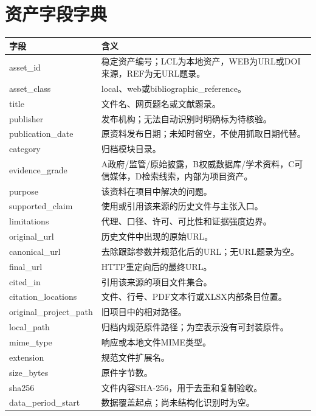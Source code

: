 \documentclass[UTF8,openany,oneside,11pt]{ctexbook}
\begin{document}
\chapter{资产字段字典}
\begin{longtable}{L{4cm}L{11.6cm}}\toprule
字段 & 含义\\\midrule\endhead
asset\_\allowbreak{}id & 稳定资产编号；LCL为本地资产，WEB为URL或DOI来源，REF为无URL题录。 \\
asset\_\allowbreak{}class & local、web或bibliographic\_reference。 \\
title & 文件名、网页题名或文献题录。 \\
publisher & 发布机构；无法自动识别时明确标为待核验。 \\
publication\_\allowbreak{}date & 原资料发布日期；未知时留空，不使用抓取日期代替。 \\
category & 归档模块目录。 \\
evidence\_\allowbreak{}grade & A政府/监管/原始披露，B权威数据库/学术资料，C可信媒体，D检索线索，内部为项目资产。 \\
purpose & 该资料在项目中解决的问题。 \\
supported\_\allowbreak{}claim & 使用或引用该来源的历史文件与主张入口。 \\
limitations & 代理、口径、许可、可比性和证据强度边界。 \\
original\_\allowbreak{}url & 历史文件中出现的原始URL。 \\
canonical\_\allowbreak{}url & 去除跟踪参数并规范化后的URL；无URL题录为空。 \\
final\_\allowbreak{}url & HTTP重定向后的最终URL。 \\
cited\_\allowbreak{}in & 引用该来源的项目文件集合。 \\
citation\_\allowbreak{}locations & 文件、行号、PDF文本行或XLSX内部条目位置。 \\
original\_\allowbreak{}project\_\allowbreak{}path & 旧项目中的相对路径。 \\
local\_\allowbreak{}path & 归档内规范原件路径；为空表示没有可封装原件。 \\
mime\_\allowbreak{}type & 响应或本地文件MIME类型。 \\
extension & 规范文件扩展名。 \\
size\_\allowbreak{}bytes & 原件字节数。 \\
sha256 & 文件内容SHA-256，用于去重和复制验收。 \\
data\_\allowbreak{}period\_\allowbreak{}start & 数据覆盖起点；尚未结构化识别时为空。 \\

\end{longtable}
\end{document}
